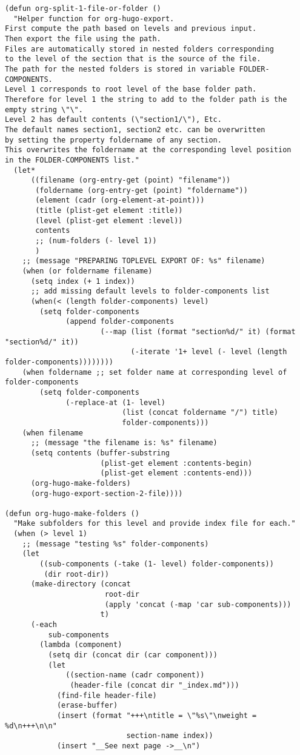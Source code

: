\documentclass[11pt]{article}
\begin{document}
\begin{verbatim}
(defun org-split-1-file-or-folder ()
  "Helper function for org-hugo-export.
First compute the path based on levels and previous input.
Then export the file using the path.
Files are automatically stored in nested folders corresponding
to the level of the section that is the source of the file.
The path for the nested folders is stored in variable FOLDER-COMPONENTS.
Level 1 corresponds to root level of the base folder path.
Therefore for level 1 the string to add to the folder path is the
empty string \"\".
Level 2 has default contents (\"section1/\"), Etc.
The default names section1, section2 etc. can be overwritten
by setting the property foldername of any section.
This overwrites the foldername at the corresponding level position
in the FOLDER-COMPONENTS list."
  (let*
      ((filename (org-entry-get (point) "filename"))
       (foldername (org-entry-get (point) "foldername"))
       (element (cadr (org-element-at-point)))
       (title (plist-get element :title))
       (level (plist-get element :level))
       contents
       ;; (num-folders (- level 1))
       )
    ;; (message "PREPARING TOPLEVEL EXPORT OF: %s" filename)
    (when (or foldername filename)
      (setq index (+ 1 index))
      ;; add missing default levels to folder-components list
      (when(< (length folder-components) level)
        (setq folder-components
              (append folder-components
                      (--map (list (format "section%d/" it) (format "section%d/" it))
                             (-iterate '1+ level (- level (length folder-components))))))))
    (when foldername ;; set folder name at corresponding level of folder-components
        (setq folder-components
              (-replace-at (1- level)
                           (list (concat foldername "/") title)
                           folder-components)))
    (when filename
      ;; (message "the filename is: %s" filename)
      (setq contents (buffer-substring
                      (plist-get element :contents-begin)
                      (plist-get element :contents-end)))
      (org-hugo-make-folders)
      (org-hugo-export-section-2-file))))

(defun org-hugo-make-folders ()
  "Make subfolders for this level and provide index file for each."
  (when (> level 1)
    ;; (message "testing %s" folder-components)
    (let
        ((sub-components (-take (1- level) folder-components))
         (dir root-dir))
      (make-directory (concat
                       root-dir
                       (apply 'concat (-map 'car sub-components)))
                      t)
      (-each
          sub-components
        (lambda (component)
          (setq dir (concat dir (car component)))
          (let
              ((section-name (cadr component))
               (header-file (concat dir "_index.md")))
            (find-file header-file)
            (erase-buffer)
            (insert (format "+++\ntitle = \"%s\"\nweight = %d\n+++\n\n"
                            section-name index))
            (insert "__See next page ->__\n")


\end{verbatim}
\end{document}
